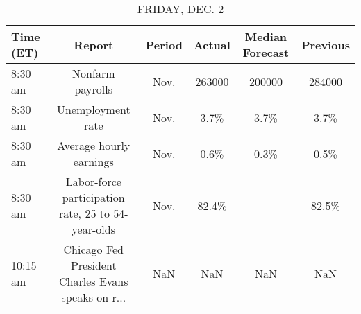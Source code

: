 \documentclass{article}%
\begin{document}
%


\begin{table}[htbp]%
\caption{FRIDAY, DEC. 2}%
\centering%
\begin{adjustbox}{width=1\textwidth}%
\begin{tabular}{lccccc}
\toprule
Time (ET) &                                             Report & Period & Actual & Median Forecast & Previous \\
\midrule
  8:30 am &                                   Nonfarm payrolls &   Nov. & 263000 &          200000 &   284000 \\
  8:30 am &                                  Unemployment rate &   Nov. &   3.7\% &            3.7\% &     3.7\% \\
  8:30 am &                            Average hourly earnings &   Nov. &   0.6\% &            0.3\% &     0.5\% \\
  8:30 am & Labor-force participation rate, 25 to 54-year-olds &   Nov. &  82.4\% &              -- &    82.5\% \\
 10:15 am & Chicago Fed President Charles Evans speaks on r... &    NaN &    NaN &             NaN &      NaN \\
\bottomrule
\end{tabular}
%
\end{adjustbox}%
\end{table}
\end{document}
